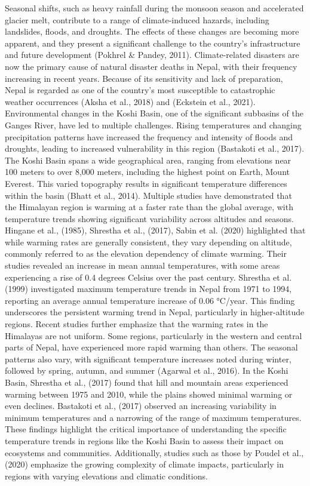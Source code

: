 Seasonal shifts, such as heavy rainfall during the monsoon season and accelerated glacier melt, contribute to a range of climate-induced hazards, including landslides, floods, and droughts. The effects of these changes are becoming more apparent, and they present a significant challenge to the country’s infrastructure and future development (Pokhrel \& Pandey, 2011). Climate-related disasters are now the primary cause of natural disaster deaths in Nepal, with their frequency increasing in recent years. Because of its sensitivity and lack of preparation, Nepal is regarded as one of the country’s most susceptible to catastrophic weather occurrences (Aksha et al., 2018)  and (Eckstein et al., 2021). Environmental changes in the Koshi Basin, one of the significant subbasins of the Ganges River, have led to multiple challenges. Rising temperatures and changing precipitation patterns have increased the frequency and intensity of floods and droughts, leading to increased vulnerability in this region (Bastakoti et al., 2017). The Koshi Basin spans a wide geographical area, ranging from elevations near 100 meters to over 8,000 meters, including the highest point on Earth, Mount Everest. This varied topography results in significant temperature differences within the basin (Bhatt et al., 2014). 
Multiple studies have demonstrated that the Himalayan region is warming at a faster rate than the global average, with temperature trends showing significant variability across altitudes and seasons. Hingane et al., (1985), Shrestha et al., (2017), Sabin et al. (2020) highlighted that while warming rates are generally consistent, they vary depending on altitude, commonly referred to as the elevation dependency of climate warming. Their studies revealed an increase in mean annual temperatures, with some areas experiencing a rise of 0.4 degrees Celsius over the past century. Shrestha et al. (1999) investigated maximum temperature trends in Nepal from 1971 to 1994, reporting an average annual temperature increase of 0.06 °C/year. This finding underscores the persistent warming trend in Nepal, particularly in higher-altitude regions.
Recent studies further emphasize that the warming rates in the Himalayas are not uniform. Some regions, particularly in the western and central parts of Nepal, have experienced more rapid warming than others. The seasonal patterns also vary, with significant temperature increases noted during winter, followed by spring, autumn, and summer (Agarwal et al., 2016). In the Koshi Basin, Shrestha et al., (2017) found that hill and mountain areas experienced warming between 1975 and 2010, while the plains showed minimal warming or even declines. Bastakoti et al., (2017)   observed an increasing variability in minimum temperatures and a narrowing of the range of maximum temperatures. These findings highlight the critical importance of understanding the specific temperature trends in regions like the Koshi Basin to assess their impact on ecosystems and communities. Additionally, studies such as those by Poudel et al., (2020) emphasize the growing complexity of climate impacts, particularly in regions with varying elevations and climatic conditions. 

